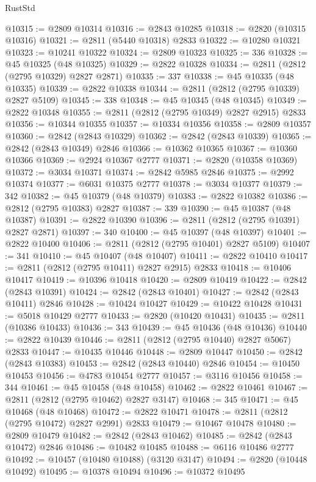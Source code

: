 \begin{lexlean}{RustStd}
\begin{coremodule}
{\begin{coremodule}
{{{{{{{{{{{{{{{{{{{{{{{{{{{{{{{{{@10315 := @2809 @10314
@10316 := @2843 @10285
@10318 := @2820 (@10315 @10316)
@10321 := @2811 (@5440 @10318) @2833
@10322 := @10280 @10321
@10323 := @10241 @10322
@10324 := @2809 @10323
@10325 := 336
@10328 := @45 @10325 (@48 @10325)
@10329 := @2822 @10328
@10334 := @2811 (@2812 (@2795 @10329) @2827 @2871)
@10335 := 337
@10338 := @45 @10335 (@48 @10335)
@10339 := @2822 @10338
@10344 := @2811 (@2812 (@2795 @10339) @2827 @5109)
@10345 := 338
@10348 := @45 @10345 (@48 @10345)
@10349 := @2822 @10348
@10355 := @2811 (@2812 (@2795 @10349) @2827 @2915) @2833
@10356 := @10344 @10355
@10357 := @10334 @10356
@10358 := @2809 @10357
@10360 := @2842 (@2843 @10329)
@10362 := @2842 (@2843 @10339)
@10365 := @2842 (@2843 @10349) @2846
@10366 := @10362 @10365
@10367 := @10360 @10366
@10369 := @2924 @10367 @2777
@10371 := @2820 (@10358 @10369)
@10372 := @3034 @10371
@10374 := @2842 @5985 @2846
@10375 := @2992 @10374
@10377 := @6031 @10375 @2777
@10378 := @3034 @10377
@10379 := 342
@10382 := @45 @10379 (@48 @10379)
@10383 := @2822 @10382
@10386 := @2812 (@2795 @10383) @2827
@10387 := 339
@10390 := @45 @10387 (@48 @10387)
@10391 := @2822 @10390
@10396 := @2811 (@2812 (@2795 @10391) @2827 @2871)
@10397 := 340
@10400 := @45 @10397 (@48 @10397)
@10401 := @2822 @10400
@10406 := @2811 (@2812 (@2795 @10401) @2827 @5109)
@10407 := 341
@10410 := @45 @10407 (@48 @10407)
@10411 := @2822 @10410
@10417 := @2811 (@2812 (@2795 @10411) @2827 @2915) @2833
@10418 := @10406 @10417
@10419 := @10396 @10418
@10420 := @2809 @10419
@10422 := @2842 (@2843 @10391)
@10424 := @2842 (@2843 @10401)
@10427 := @2842 (@2843 @10411) @2846
@10428 := @10424 @10427
@10429 := @10422 @10428
@10431 := @5018 @10429 @2777
@10433 := @2820 (@10420 @10431)
@10435 := @2811 (@10386 @10433)
@10436 := 343
@10439 := @45 @10436 (@48 @10436)
@10440 := @2822 @10439
@10446 := @2811 (@2812 (@2795 @10440) @2827 @5067) @2833
@10447 := @10435 @10446
@10448 := @2809 @10447
@10450 := @2842 (@2843 @10383)
@10453 := @2842 (@2843 @10440) @2846
@10454 := @10450 @10453
@10456 := @4783 @10454 @2777
@10457 := @3116 @10456
@10458 := 344
@10461 := @45 @10458 (@48 @10458)
@10462 := @2822 @10461
@10467 := @2811 (@2812 (@2795 @10462) @2827 @3147)
@10468 := 345
@10471 := @45 @10468 (@48 @10468)
@10472 := @2822 @10471
@10478 := @2811 (@2812 (@2795 @10472) @2827 @2991) @2833
@10479 := @10467 @10478
@10480 := @2809 @10479
@10482 := @2842 (@2843 @10462)
@10485 := @2842 (@2843 @10472) @2846
@10486 := @10482 @10485
@10488 := @6116 @10486 @2777
@10492 := @10457 (@10480 @10488) (@3120 @3147)
@10494 := @2820 (@10448 @10492)
@10495 := @10378 @10494
@10496 := @10372 @10495
}}}}}}}}}}}}}}}}}}}}}}}}}}}}}}}}}
\end{coremodule}}
\end{coremodule}
\end{lexlean}
